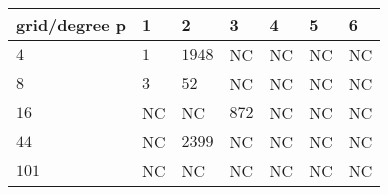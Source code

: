 \begin{tabular}{lllllll}
\hline
 grid/degree p   & 1   & 2      & 3     & 4   & 5   & 6   \\
\hline
 $4$             & $1$ & $1948$ & NC    & NC  & NC  & NC  \\
 $8$             & $3$ & $52$   & NC    & NC  & NC  & NC  \\
 $16$            & NC  & NC     & $872$ & NC  & NC  & NC  \\
 $44$            & NC  & $2399$ & NC    & NC  & NC  & NC  \\
 $101$           & NC  & NC     & NC    & NC  & NC  & NC  \\
\hline
\end{tabular}